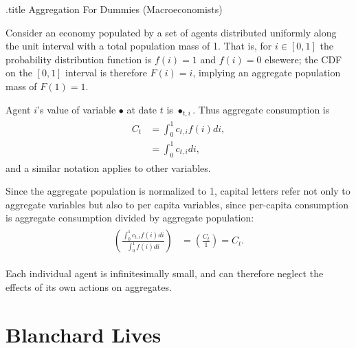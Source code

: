 \documentclass{handout}
\begin{document}
\large
\handoutHeader


\begin{verbatimwrite}{\jobname.title}
Aggregation For Dummies (Macroeconomists)
\end{verbatimwrite}

\handoutNameMake



Consider an economy populated by a set of agents distributed uniformly along 
the unit interval with a total population mass of 1.  That is, for $i \in [0,1]$ the 
probability distribution function is $f(i) = 1$ and $f(i)=0$ elsewere; the CDF on the $[0,1]$ interval is therefore
$F(i)=i$, implying an aggregate population mass of $F(1)=1$.  

Agent $i$'s value of variable $\bullet$ at date $t$ is $\bullet_{t,i}$.
Thus aggregate consumption is 
\begin{equation}\begin{gathered}\begin{aligned}
  C_{t} & =  \int_{0}^{1} c_{t,i} f(i) di,
\\ & =  \int_{0}^{1} c_{t,i} di,
\end{aligned}\end{gathered}\end{equation}
and a similar notation applies to other variables.

Since the aggregate population is normalized to 1, capital
letters refer not only to aggregate variables but also to
per capita variables, since per-capita consumption is 
aggregate consumption divided by aggregate population:
\begin{equation}\begin{gathered}\begin{aligned}
  \left(\frac{\int_{0}^{1} c_{t,i} f(i) di}{\int_{0}^{1} f(i) di}\right) & =  \left(\frac{C_{t}}{1}\right) = C_{t}.
\end{aligned}\end{gathered}\end{equation}

Each individual agent is infinitesimally small, and can therefore
neglect the effects of its own actions on aggregates.

\section{Blanchard Lives}
\end{document}
